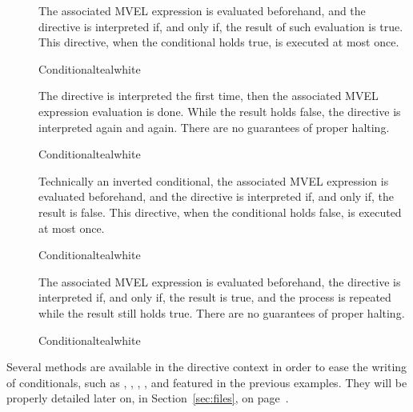 \begin{description}
\item[] The associated \gls{MVEL} expression is evaluated beforehand, and the directive is interpreted if, and only if, the result of such evaluation is true. This directive, when the conditional holds true, is executed at most once.

\begin{codebox}{Conditional}{teal}{\icnote}{white}
\end{codebox}

\item[] The directive is interpreted the first time, then the associated \gls{MVEL} expression evaluation is done. While the result holds false, the directive is interpreted again and again. There are no guarantees of proper halting.

\begin{codebox}{Conditional}{teal}{\icnote}{white}
\end{codebox}

\item[] Technically an inverted  conditional, the associated \gls{MVEL} expression is evaluated beforehand, and the directive is interpreted if, and only if, the result is false. This directive, when the conditional holds false, is executed at most once.

\begin{codebox}{Conditional}{teal}{\icnote}{white}
\end{codebox}

\item[] The associated \gls{MVEL} expression is evaluated beforehand, the directive is interpreted if, and only if, the result is true, and the process is repeated while the result still holds true. There are no guarantees of proper halting.

\begin{codebox}{Conditional}{teal}{\icnote}{white}
\end{codebox}
\end{description}

Several methods are available in the directive context in order to ease the writing of conditionals, such as , , , , and  featured in the previous examples. They will be properly detailed later on, in Section~\ref{sec:files}, on page~\pageref{sec:files}.


